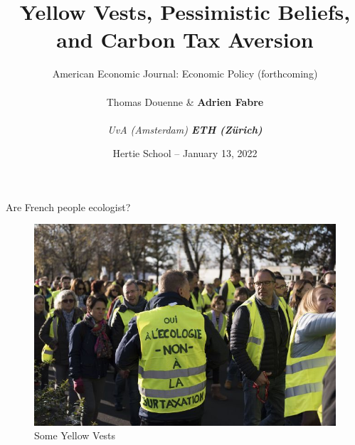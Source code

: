 \documentclass[aspectratio=169,9pt,dvipsnames]{beamer}
\title[Carbon Tax Aversion]{\huge Yellow Vests, Pessimistic Beliefs, \\ and Carbon Tax Aversion}
\author[Douenne \& \textbf{Fabre}]{American Economic Journal: Economic Policy (forthcoming) \\ $\quad$ \\ \Large Thomas Douenne \& \textbf{Adrien Fabre} \large \\ $\quad$ \\ \textit{UvA (Amsterdam) \quad \textbf{ETH (Zürich)}}}
\date[\insertsection]{Hertie School -- January 13, 2022}
\begin{document}
	\begin{frame}

\titlepage

	\end{frame}

\AtBeginSection[]
{
  \begin{frame}
  \tableofcontents[currentsection]
  \end{frame} 
}

    \begin{frame}{Are French people ecologist?}%

\begin{figure}[h!]
\centering
\includegraphics[width=.74\textwidth]{Images/GJ.jpg}
\caption{Some Yellow Vests}
\end{figure}



\end{frame}
\end{document}
